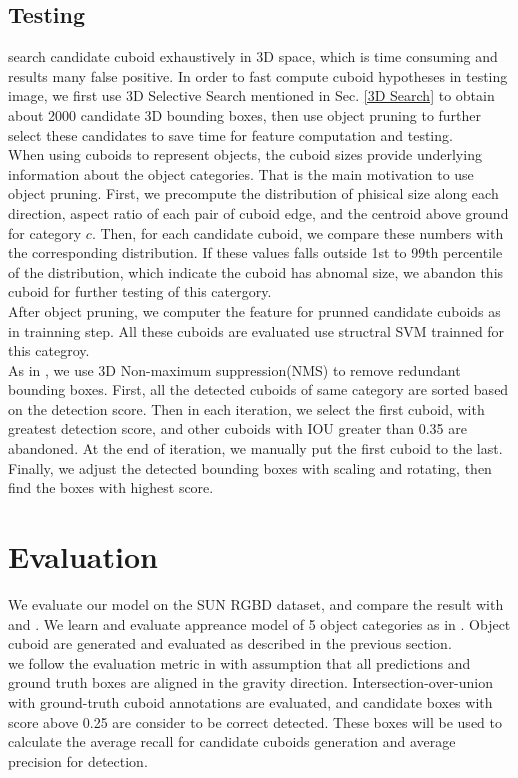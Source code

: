 \documentclass[english]{ccdconf}
\begin{document}
\subsection{Testing}
\label{Test}
\cite{ren2016three} search candidate cuboid exhaustively in 3D space, which is time consuming and results many false positive. In order to fast compute cuboid hypotheses in testing image, we first use 3D Selective Search mentioned in Sec. \ref{3D Search} to obtain about 2000 candidate 3D bounding boxes, then use object pruning to further select these candidates to save time for feature computation and testing.\\
When using cuboids to represent objects,  the cuboid sizes provide underlying information about the object categories. That is the main motivation to use object pruning. First, we precompute the distribution of phisical size along each direction, aspect ratio of each pair of cuboid edge, and the centroid above ground for category $c$. Then, for each candidate cuboid, we compare these numbers with the corresponding distribution. If these values falls outside 1st to 99th percentile of the distribution, which indicate the cuboid has abnomal size, we abandon this cuboid for further testing of this catergory.\\
After object pruning, we computer the feature for prunned candidate cuboids as in trainning step. All these cuboids are evaluated use structral SVM trainned for this categroy.\\
As in \cite{song2016deep}, we use 3D Non-maximum suppression(NMS) to remove redundant bounding boxes. First, all the detected cuboids of same category are sorted based on the detection score. Then in each iteration, we select the first cuboid, with greatest detection score, and other cuboids with IOU greater than 0.35 are abandoned. At the end of iteration, we manually put the first cuboid to the last. \\
Finally, we adjust the detected bounding boxes with scaling and rotating, then find the boxes with highest score.
\section{Evaluation}
We evaluate our model on the SUN RGBD dataset\cite{song2015sun}, and compare the result with \cite{song2014sliding} and \cite{ren2016three}. We learn and evaluate appreance model of 5 object categories as in \cite{song2014sliding}. Object cuboid are generated and evaluated as described in the previous section.\\
we follow the evaluation metric in \cite{song2014sliding} with assumption that all predictions and ground truth boxes are aligned in the gravity direction. Intersection-over-union with ground-truth cuboid annotations are evaluated, and candidate boxes with score above 0.25 are consider to be correct detected. These boxes will be used to calculate the average recall for candidate cuboids generation and average precision for detection. 
\end{document}

